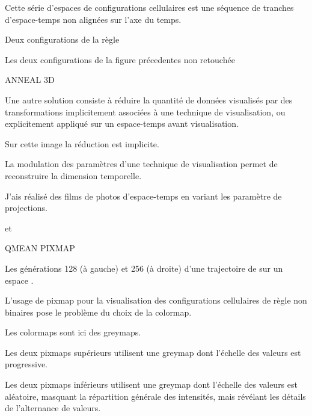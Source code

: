 {}
{Cette s\'erie d'espaces de configurations cellulaires est une s\'equence
  de tranches d'espace-temps non align\'ees sur l'axe du temps.}

\begin{slide}
  {   }
\end{slide}

\begin{slide}
  {   }
\end{slide}

\begin{slide}
  {Deux configurations de la r\`egle~}%
\end{slide}


\begin{slide}
  {Les deux configurations de la figure pr\'ecedentes non retouch\'ee}%
\end{slide}


%
{%
  }
{%
  ANNEAL 3D

  Une autre solution consiste \`a r\'eduire la quantit\'e de donn\'ees
  visualis\'es par des transformations implicitement associ\'ees \`a une
  technique de visualisation, ou explicitement appliqu\'e sur un
  espace-temps avant visualisation.

  Sur cette image la r\'eduction est implicite.
  
  La modulation des param\`etres d'une technique de visualisation permet
  de reconstruire la dimension temporelle.

  J'ais r\'ealis\'e des films de photos d'espace-temps en variant les
  param\`etre de projections.}

{%
  {   et }}
{%
  QMEAN PIXMAP

  Les g\'en\'erations 128 (\`a gauche) et 256 (\`a droite) d'une trajectoire
  de  sur un espace .

  L'usage de pixmap pour la visualisation des configurations
  cellulaires de r\`egle non binaires pose le probl\`eme du choix de la
  colormap.

  Les colormaps sont ici des greymaps.

  Les deux pixmaps sup\'erieurs utilisent une greymap dont l'\'echelle
  des  valeurs est progressive.

  Les deux pixmaps inf\'erieurs utilisent une greymap dont l'\'echelle des
  valeurs est al\'eatoire, masquant la r\'epartition g\'en\'erale des
  intensit\'es, mais r\'ev\'elant les d\'etails de l'alternance de valeurs.}

